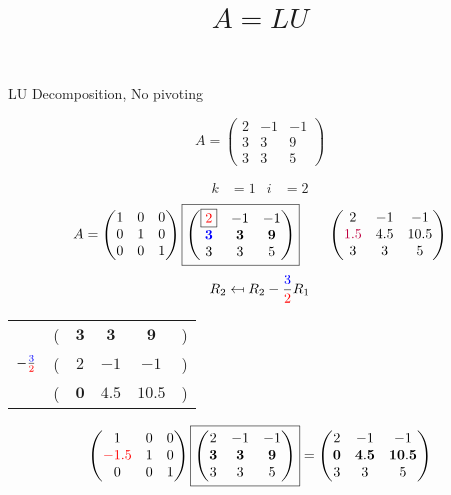 \documentclass[pdf]{beamer}
\title{$A=LU$}
\subtitle{}
\author{}
\begin{document}
\begin{frame}{}
\begin{center}LU Decomposition, No pivoting\end{center} $$A = \begin{pmatrix}2&-1&-1\\3&3&9\\3&3&5\end{pmatrix}$$\end{frame}
\begin{frame}{}\begin{align*} k &= 1 & i &= 2 \end{align*} $$A=\begin{pmatrix}1&0&0\\0&1&0\\0&0&1\end{pmatrix} \boxed{\begin{pmatrix}\boxed{{\color{red}2}}&-1&-1\\\mathbf{{\color{blue}3}}&\mathbf{3}&\mathbf{9}\\3&3&5\end{pmatrix}} \quad\quad \begin{pmatrix}2&-1&-1\\{\color{purple}1.5}&4.5&10.5\\3&3&5\end{pmatrix}$$ $$R_2 \mapsfrom R_2 - \frac{{\color{blue}3}}{{\color{red}2}} R_1$$ \begin{center}\begin{tabular}{cccccc}  &(& $ \mathbf{3} $ & $ \mathbf{3} $ & $ \mathbf{9} $ &)\\$ -\frac{{\color{blue}3}}{{\color{red}2}} $&(& $ 2 $ & $ -1 $ & $ -1 $ &)\\\hline  &(& $ \mathbf{0} $ & $ \mathbf{4.5} $ & $ \mathbf{10.5} $ &) \end{tabular}\end{center} $$ \begin{pmatrix}1&0&0\\{\color{red}-1.5}&1&0\\0&0&1\end{pmatrix} \boxed{\begin{pmatrix}2&-1&-1\\\mathbf{3}&\mathbf{3}&\mathbf{9}\\3&3&5\end{pmatrix}} = \begin{pmatrix}2&-1&-1\\\mathbf{0}&\mathbf{4.5}&\mathbf{10.5}\\3&3&5\end{pmatrix} $$\end{frame}
\end{document}
